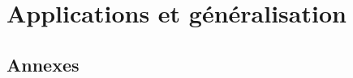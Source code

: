 \part{Applications et généralisation} \label{part:app&gene} 

	

	
	
	
	

\newpage





\begin{annexe}
	
	\part{Annexes} 
		
	
		
\end{annexe}


\vfill


 {}\listoffigures
\lstlistoflistings

\vfill




\newpage

{}


